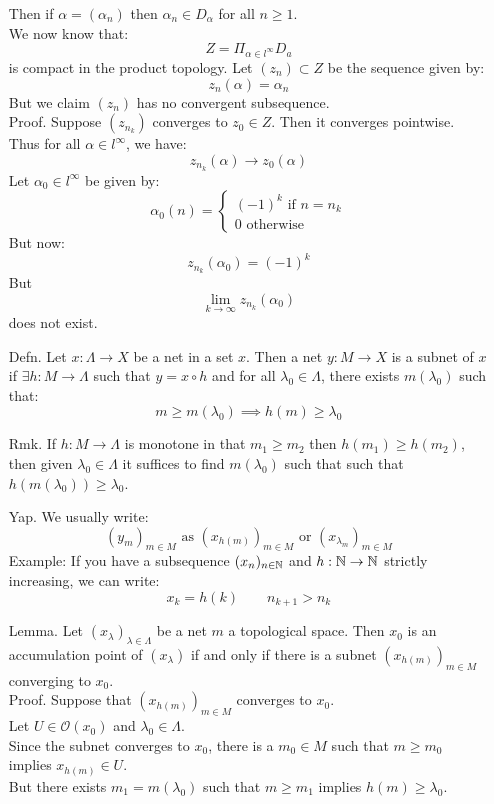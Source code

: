 \documentclass[12pt]{article}
\begin{document}
\begin{itemize}
    Then if $\alpha = (\alpha_n)$ then $\alpha_n \in D_\alpha$ for all $n \geq 1$. \\
    We now know that:
    \[Z = \Pi_{\alpha \in l^\infty} D_a\]
    is compact in the product topology. Let $(z_n) \subset Z$ be the sequence given by: 
    \[ z_n(\alpha) = \alpha_n\] 
    But we claim $(z_n)$ has no convergent subsequence. \\
    Proof. Suppose $(z_{n_k})$ converges to $z_0 \in Z$. Then it converges pointwise. Thus for all $\alpha \in l^\infty$, we have:
    \[z_{n_k}(\alpha) \to z_0(\alpha)\]
    Let $\alpha_0 \in l^\infty$ be given by: 
    \[ \alpha_0(n) = \begin{cases}
        (-1)^k \text{ if } n = n_k \\
        0 \text{ otherwise }
    \end{cases}\]
    But now:
    \[ z_{n_k}(\alpha_0) = (-1)^k\]
    But
    \[ \lim_{k \to \infty} z_{n_k}(\alpha_0)\]
    does not exist. 
    \item[Defn.] Let $x: \Lambda \to X$ be a net in a set $x$. Then a net $y: M \to X$ is a subnet of $x$ if $\exists h: M \to \Lambda$ such that $y = x \circ h$ and for all $\lambda_0 \in \Lambda$, there exists $m(\lambda_0)$ such that: 
    \[ m \geq m(\lambda_0)  \implies h(m) \geq \lambda_0\]
    \item[Rmk.] If $h: M \to \Lambda$ is monotone in that $m_1 \geq m_2$ then $h(m_1) \geq h(m_2)$, then given $\lambda_0 \in \Lambda$ it suffices to find $m(\lambda_0)$ such that such that $h(m(\lambda_0)) \geq \lambda_0$.
    \item[Yap.] We usually write: 
    \[ (y_m)_{m\in M} \text{ as } (x_{h(m)})_{m\in M} \text{ or } (x_{\lambda_m})_{m \in M}\] 
    Example: If you have a subsequence $(x_n)_{n \in \mathbb N}$ and $h: \mathbb N \to \mathbb N$ strictly increasing, we can write: 
    \[ x_k = h(k) \qquad n_{k+1} > n_k\]
    \item[Lemma.] Let $(x_\lambda)_{\lambda \in \Lambda}$ be a net $m$ a topological space. Then $x_0$ is an accumulation point of $(x_\lambda)$ if and only if there is a subnet $(x_{h(m)})_{m \in M}$ converging to $x_0$. \\
    Proof. Suppose that $(x_{h(m)})_{m \in M}$ converges to $x_0$. \\ 
    Let $U \in \mathcal{O}(x_0)$ and $\lambda_0 \in \Lambda$. \\
    Since the subnet converges to $x_0$, there is a $m_0 \in M$ such that $m \geq m_0$ implies $x_{h(m)} \in U$. \\
    But there exists $m_1 = m(\lambda_0)$ such that $m\geq m_1$ implies $h(m) \geq \lambda_0$. \\

\end{itemize}
\end{document}
